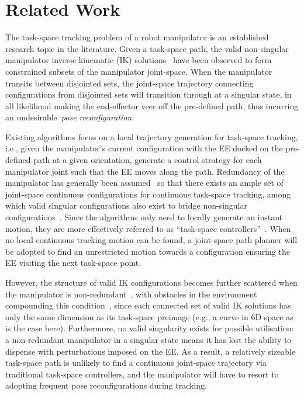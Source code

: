 \documentclass[letterpaper, 10 pt, journal, twoside]{ieeetran}  %
\begin{document}
\section{Related Work}\label{section:related_work}
The task-space tracking problem of a robot manipulator is an established research topic in the literature. Given a task-space path, the valid non-singular manipulator inverse kinematic (IK) solutions~\cite{Lavalle2006Planning} have been observed to form constrained subsets of the manipulator joint-space. 
When the manipulator transits between disjointed sets, the joint-space trajectory connecting configurations from disjointed sets will transition through at a singular state, in all likelihood making the end-effector veer off the pre-defined path, thus incurring an undesirable~\textit{pose reconfiguration}. 

Existing algorithms focus on a local trajectory generation for task-space tracking, i.e., given the manipulator's current configuration with the EE docked on the pre-defined path at a given orientation, generate a control strategy for each manipulator joint such that the EE moves along the path. 
Redundancy of the manipulator has generally been assumed~\cite{Egeland1987Task} so that there exists an ample set of joint-space continuous configurations for continuous task-space tracking, among which valid singular configurations also exist to bridge non-singular configurations~\cite{Porta2012Randomized}. 
Since the algorithms only need to locally generate an instant motion, they are more effectively referred to as ``task-space controllers''~\cite{Xian2004Task}. 
When no local continuous tracking motion can be found, a joint-space path planner will be adopted to find an unrestricted motion towards a configuration ensuring the EE visiting the next task-space point. 

However, the structure of valid IK configurations becomes further scattered when the manipulator is non-redundant~\cite{Mayorga1987Singularities}, with obstacles in the environment compounding this condition~\cite{Khatib1986Real}, since each connected set of valid IK solutions has only the same dimension as its task-space preimage (e.g., a curve in 6D space as is the case here). Furthermore, no valid singularity exists for possible utilisation: a non-redundant manipulator in a singular state means it has lost the ability to dispense with perturbations imposed on the EE. As a result, a relatively sizeable task-space path is unlikely to find a continuous joint-space trajectory via traditional task-space controllers, and the manipulator will have to resort to adopting frequent pose reconfigurations during tracking. 
\end{document}
